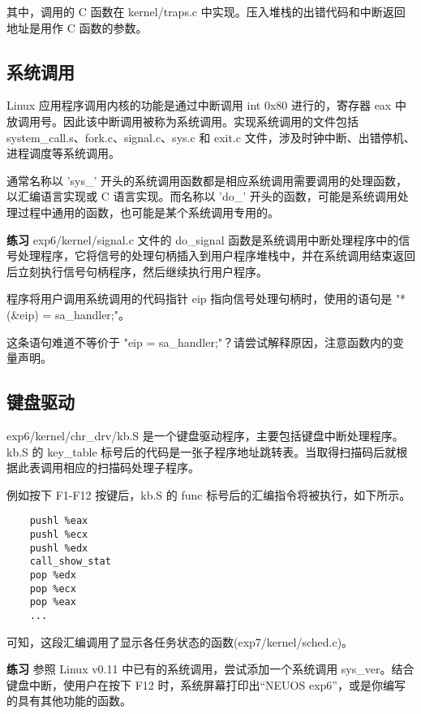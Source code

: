 其中，调用的 C 函数在 kernel/traps.c 中实现。压入堆栈的出错代码和中断返回地址是用作 C 函数的参数。

\subsection{系统调用}

Linux 应用程序调用内核的功能是通过中断调用 int 0x80 进行的，寄存器 eax 中放调用号。因此该中断调用被称为系统调用。实现系统调用的文件包括 system\_call.s、fork.c、signal.c、sys.c 和 exit.c 文件，涉及时钟中断、出错停机、进程调度等系统调用。

通常名称以 'sys\_' 开头的系统调用函数都是相应系统调用需要调用的处理函数，以汇编语言实现或 C 语言实现。而名称以 'do\_' 开头的函数，可能是系统调用处理过程中通用的函数，也可能是某个系统调用专用的。

\begin{mdframed}[hidealllines=true,backgroundcolor=gray!20]
\textbf{练习 } exp6/kernel/signal.c 文件的 do\_signal 函数是系统调用中断处理程序中的信号处理程序，它将信号的处理句柄插入到用户程序堆栈中，并在系统调用结束返回后立刻执行信号句柄程序，然后继续执行用户程序。

程序将用户调用系统调用的代码指针 eip 指向信号处理句柄时，使用的语句是 "*(\&eip) = sa\_handler;"。

这条语句难道不等价于 "eip = sa\_handler;"？请尝试解释原因，注意函数内的变量声明。
\end{mdframed}

\subsection{键盘驱动}

exp6/kernel/chr\_drv/kb.S 是一个键盘驱动程序，主要包括键盘中断处理程序。kb.S 的 key\_table 标号后的代码是一张子程序地址跳转表。当取得扫描码后就根据此表调用相应的扫描码处理子程序。

例如按下 F1-F12 按键后，kb.S 的 func 标号后的汇编指令将被执行，如下所示。

\begin{lstlisting}
    pushl %eax
    pushl %ecx
    pushl %edx
    call_show_stat
    pop %edx
    pop %ecx
    pop %eax
    ...
\end{lstlisting}

可知，这段汇编调用了显示各任务状态的函数(exp7/kernel/sched.c)。

\begin{mdframed}[hidealllines=true,backgroundcolor=gray!20]
\textbf{练习 }参照 Linux v0.11 中已有的系统调用，尝试添加一个系统调用 sys\_ver。结合键盘中断，使用户在按下 F12 时，系统屏幕打印出“NEUOS exp6”，或是你编写的具有其他功能的函数。
\end{mdframed}

